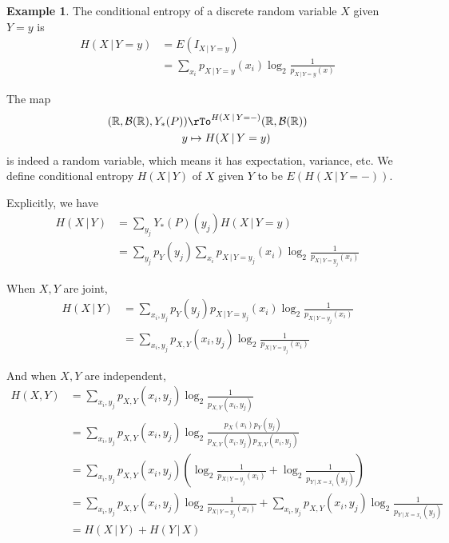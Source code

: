 \documentclass[12pt]{amsart}
\theoremstyle{definition}
\newtheorem{example}[theorem]{Example}
\begin{document}
\begin{example} The conditional entropy of a discrete random variable $X$ given $Y = y$ is
\begin{align*}
H(X \,|\, Y = y) & = E(I_{X \,|\, Y = y}) \\
 & = \sum\limits_{x_i} p_{X \,|\, Y = y}(x_i) \log_2 \frac{1}{p_{X \,|\, Y = y}(x)}
\end{align*}
\end{example}

The map
\begin{align*}
(\mathbb{R}, \mathcal{B}(\mathbb{R}), Y_*(P)) & \rTo^{H(X \,|\, Y = -)} (\mathbb{R}, \mathcal{B}(\mathbb{R})) \\
y & \mapsto H(X \,|\, Y = y)
\end{align*}
is indeed a random variable, which means it has expectation, variance, etc.
\dfn We define conditional entropy $H(X \,|\, Y)$ of $X$ given $Y$ to be $E(H(X \,|\, Y = -))$.

Explicitly, we have
\begin{align*}
H(X \,|\, Y) & = \sum\limits_{y_j} Y_*(P)(y_j) H(X \,|\, Y = y) \\
 & = \sum\limits_{y_j} p_Y(y_j) \sum\limits_{x_i} p_{X \,|\, Y = y_j}(x_i) \log_2 \frac{1}{p_{X \,|\, Y = y_j}(x_i)}
\end{align*}
 
When $X, Y$ are joint,
\begin{align*}
H(X \,|\, Y) & = \sum\limits_{x_i, y_j} p_Y(y_j)p_{X \,|\, Y = y_j}(x_i) \log_2 \frac{1}{p_{X \,|\, Y = y_j}(x_i)} \\
 & = \sum\limits_{x_i, y_j} p_{X, Y}(x_i, y_j) \log_2 \frac{1}{p_{X \,|\, Y = y_j}(x_i)}
\end{align*}

And when $X, Y$ are independent,
\begin{align*}
H(X, Y) & = \sum\limits_{x_i, y_j} p_{X, Y}(x_i, y_j) \log_2 \frac{1}{p_{X, Y}(x_i, y_j)} \\
 & = \sum\limits_{x_i, y_j} p_{X, Y}(x_i, y_j) \log_2 \frac{p_X(x_i) p_Y(y_j)}{p_{X, Y}(x_i, y_j) p_{X, Y}(x_i, y_j)} \\
 & = \sum\limits_{x_i, y_j} p_{X, Y}(x_i, y_j) \left( \log_2 \frac{1}{p_{X \,|\, Y = y_j}(x_i)} + \log_2 \frac{1}{p_{Y \,|\, X = x_i}(y_j)} \right) \\
 & = \sum\limits_{x_i, y_j} p_{X, Y}(x_i, y_j) \log_2 \frac{1}{p_{X \,|\, Y = y_j}(x_i)} + \sum\limits_{x_i, y_j} p_{X, Y}(x_i, y_j) \log_2 \frac{1}{p_{Y \,|\, X = x_i}(y_j)} \\
 & = H(X \,|\, Y) + H(Y \,|\, X)
\end{align*}
\end{document}
